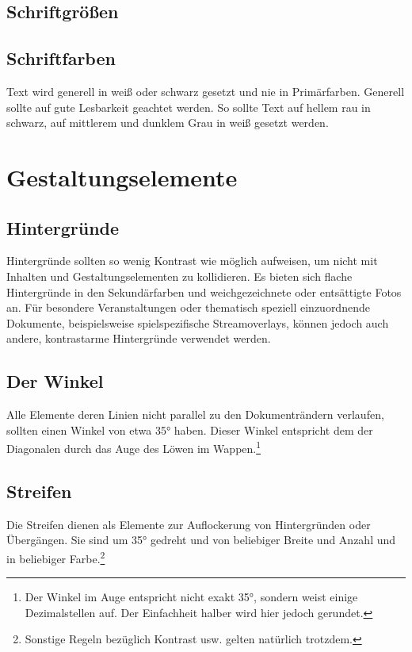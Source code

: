 \documentclass{article}
\begin{document}
\subsection{Schriftgrößen}

\subsection{Schriftfarben}
Text wird generell in weiß oder schwarz gesetzt und nie in Primärfarben. Generell sollte auf gute Lesbarkeit geachtet werden. So sollte Text auf hellem rau in schwarz, auf mittlerem und dunklem Grau in weiß gesetzt werden.

\cleardoublepage
\section{Gestaltungselemente}

\subsection{Hintergründe}
Hintergründe sollten so wenig Kontrast wie möglich aufweisen, um nicht mit Inhalten und Gestaltungselementen zu kollidieren.
Es bieten sich flache Hintergründe in den Sekundärfarben und weichgezeichnete oder entsättigte Fotos an.
Für besondere Veranstaltungen oder thematisch speziell einzuordnende Dokumente, beispielsweise spielspezifische Streamoverlays, können jedoch auch andere, kontrastarme Hintergründe verwendet werden.


\subsection{Der Winkel}
Alle Elemente deren Linien nicht parallel zu den Dokumenträndern verlaufen, sollten einen Winkel von etwa 35° haben.
Dieser Winkel entspricht dem der Diagonalen durch das Auge des Löwen im Wappen.\footnote{Der Winkel im Auge entspricht nicht exakt 35°, sondern weist einige Dezimalstellen auf. Der Einfachheit halber wird hier jedoch gerundet.}


\subsection{Streifen}
Die Streifen dienen als Elemente zur Auflockerung von Hintergründen oder Übergängen.
Sie sind um 35° gedreht und von beliebiger Breite und Anzahl und in beliebiger Farbe.\footnote{Sonstige Regeln bezüglich Kontrast usw. gelten natürlich trotzdem.}
\end{document}
